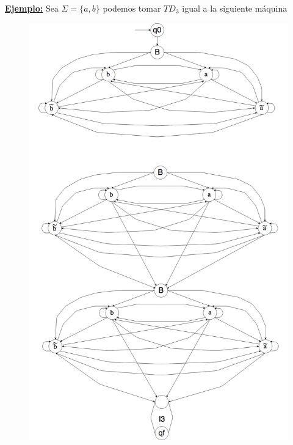 \begin{frame}
  \PN \underline{\textbf{Ejemplo:}} Sea $\Sigma = \{a, b\}$ podemos tomar $TD_{3}$ igual a la siguiente máquina
  \begin{figure}[h]
    \centering
    \includegraphics[scale=0.125]{graphics/figure_3.png}
  \end{figure}
\end{frame}
